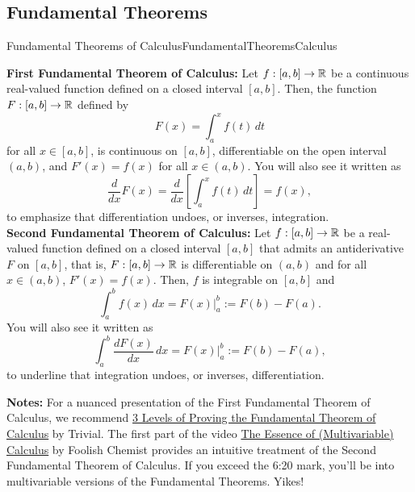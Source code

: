 \subsection{Fundamental Theorems}

\begin{propColor}{Fundamental Theorems of Calculus}{FundamentalTheoremsCalculus}

\textbf{First Fundamental Theorem of Calculus:}
Let \( f:[a, b] \to \mathbb R \) be a continuous real-valued function defined on a closed interval \([a, b]\). Then, the function \( F:[a, b] \to \mathbb R \) defined by
\begin{equation}
    \label{eq:FirstFundThmCalculusVo1}
F(x) = \int_a^x f(t) \, dt
\end{equation}
for all \( x \in [a, b]\), is continuous on \([a, b]\), differentiable on the open interval \( (a, b) \), and \( F'(x) = f(x) \) for all \( x \in  (a, b) \). You will also see it written as 
\begin{equation}
    \label{eq:FirstFundThmCalculusVo2}
   \frac{d}{dx}  F(x) =  \frac{d}{dx} \left[ \int_a^x f(t) \, dt \right] = f(x),
\end{equation}
to emphasize that differentiation undoes, or inverses, integration.
\\

\textbf{Second Fundamental Theorem of Calculus:}
Let \( f:[a, b] \to \mathbb R \) be a real-valued function defined on a closed interval \([a, b]\) that admits an antiderivative \( F \) on \([a, b]\), that is, $F:[a, b] \to \mathbb R$ is differentiable on $(a, b)$ and for all $x \in (a, b)$, $F'(x) = f(x)$. Then,  \( f \) is integrable on \([a, b]\) and
\begin{equation}
    \label{eq:SecondFundThmCalculusVo1}
\int_a^b f(x) \, dx = F(x) \Big|_a^b := F(b) - F(a).
\end{equation}
You will also see it written as 
\begin{equation}
    \label{eq:SecondFundThmCalculusVo2}
\int_a^b \frac{dF(x)}{dx} \, dx = F(x) \Big|_a^b := F(b) - F(a), 
\end{equation}
to underline that integration undoes, or inverses, differentiation.

\bigskip

\textbf{Notes:} For a nuanced presentation of the First Fundamental Theorem of Calculus, we recommend \href{https://youtu.be/tgOgjbYs97A}{3 Levels of Proving the Fundamental Theorem of Calculus} by Trivial. The first part of the video \href{https://youtu.be/Jk_k3q9RoMU?t=127}{The Essence of (Multivariable) Calculus} by Foolish Chemist provides an intuitive treatment of the Second Fundamental Theorem of Calculus. If you exceed the 6:20 mark, you'll be into multivariable versions of the Fundamental Theorems. Yikes! 
\end{propColor}


